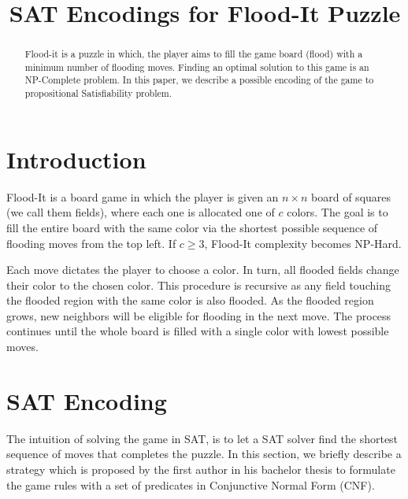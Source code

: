 \documentclass[conference]{IEEEtran}
\newcommand{\bSize}{\ensuremath{n}\xspace}
\newcommand{\clr}{\ensuremath{c}\xspace}
\begin{document}
\title{SAT Encodings for Flood-It Puzzle
}

\author{
	\and
}

\maketitle

\begin{abstract}
Flood-it is a puzzle in which, the player aims to fill the game board (flood) with a minimum number of flooding moves. Finding an optimal solution to this game is an NP-Complete problem. In this paper, we describe a possible encoding of the game to propositional Satisfiability problem. 
\end{abstract}

\section{Introduction}
Flood-It is a board game in which the player is given an $\bSize\times\bSize$ board of squares (we call them fields), where each one is allocated one of \clr colors. The goal is to fill the entire board with the same color via the shortest possible sequence of flooding moves from the top left. If $\clr \ge 3$, Flood-It complexity becomes NP-Hard\cite{floodit, floodit2}.

Each move dictates the player to choose a color. In turn, all flooded fields change their color to the chosen color. This procedure is recursive as any field touching the flooded region with the same color is also flooded. As the flooded region grows, new neighbors will be eligible for flooding in the next move. The process continues until the whole board is filled with a single color with lowest possible moves.

\section{SAT Encoding}
The intuition of solving the game in SAT, is to let a SAT solver find the shortest sequence of moves that completes the puzzle. In this section, we briefly describe a strategy which is proposed by the first author in his bachelor thesis\cite{thesis} to formulate the game rules with a set of predicates in Conjunctive Normal Form (CNF).
\end{document}
